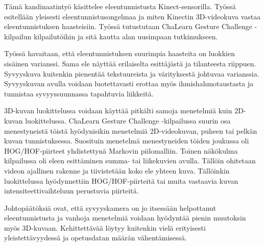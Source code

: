 %
%

\begin{fiabstract}
Tämä kandinaatintyö käsittelee eleentunnistusta Kinect-sensorilla.
Työssä esitellään yleisesti eleentunnistusongelmaa ja miten Kinectin 3D-videokuva vastaa eleentunnistuksen haasteisiin.
Työssä tutustutaan ChaLearn Gesture Challenge -kilpailun kilpailutöihin ja sitä kautta alan uusimpaan tutkimukseen.

Työssä havaitaan, että eleentunnistuksen suurimpia haasteita on luokkien sisäinen varianssi. Sama ele näyttää erilaiselta
esittäjästä ja tilanteesta riippuen. Syvyyskuva kuitenkin pienentää tekstuureista ja värityksestä johtuvaa varianssia.
Syvyyskuvan avulla voidaan luotettavasti erottaa myös ihmishahmotaustasta ja tunnistaa syvyyssuunnassa tapahtuvia liikkeitä.

3D-kuvan luokittelussa voidaan käyttää pitkälti samoja menetelmiä kuin 2D-kuvan luokittelussa. ChaLearn Gesture Challenge -kilpailussa
suurin osa menestyneistä töistä hyödynisikin menetelmiä 2D-videokuvan, puheen tai pelkän kuvan tunnistuksessa. Suosituin menetelmä
menestyneiden töiden joukussa oli HOG/HOF-piirteet yhdistettynä Markovin piilomalliin.  Toinen 
näkökulma kilpailussa oli eleen esittäminen summa- tai liikekuvien avulla. Tällöin ohitetaan videon ajallinen rakenne ja tiivistetään
koko ele yhteen kuva. Tällöinkin luokittelussa hyödynnettiin HOG/HOF-piirteitä tai muita vastaavia kuvan intensiteettivaihteluun perustuvia piirteitä.

Johtopäätöksiä ovat, että syvyyskamera on jo itsessään helpottanut eleentunnistusta ja vanhoja menetelmiä voidaan hyödyntää
pienin muutoksin myös 3D-kuvaan. Kehittettävää löytyy kuitenkin vielä erityisesti yleistettävyydessä ja opetusdatan määrän vähentämisessä.
%
\end{fiabstract}




